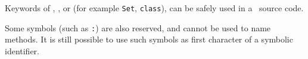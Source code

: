 
Keywords of {\coq}, {\dedukti}, or {\ocaml} (for example {\tt Set}, {\tt class}),
can be safely used in a \focal\ source code.

Some symbols (such as {\tt :}) are also reserved, and cannot be used to name methods.
It is still possible to use such symbols as first character of a symbolic identifier.
